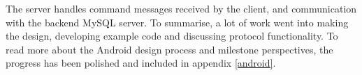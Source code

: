 The server handles command messages received by the client, and communication with the backend MySQL server.
To summarise, a lot of work went into making the design, developing example code and discussing protocol functionality. To read more about the Android design process and milestone perspectives, the progress has been polished and included in appendix \vref{android}.
